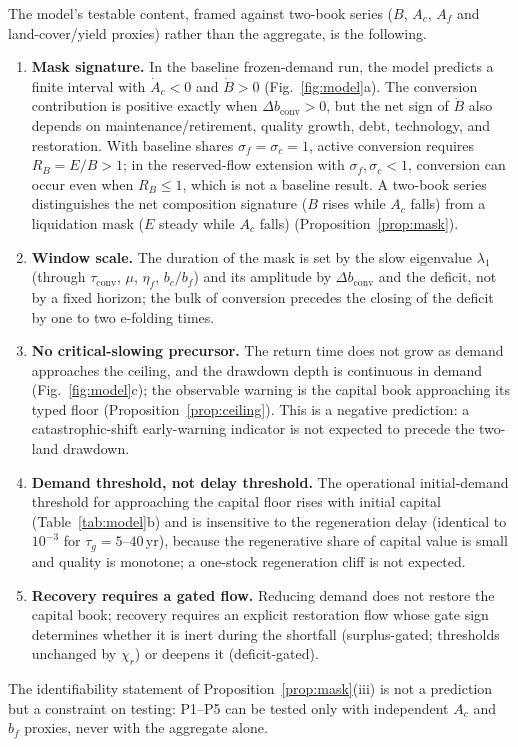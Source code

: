 \documentclass[preprint,12pt,authoryear]{elsarticle}
\newcommand{\dconv}{\Delta b_{\mathrm{conv}}}
\newcommand{\tconv}{\tau_{\mathrm{conv}}}
\begin{document}
The model's testable content, framed against two-book series ($B$, $A_c$, $A_f$ and land-cover/yield proxies) rather than the aggregate, is the following.
\begin{enumerate}[label=P\arabic*.,leftmargin=2.2em]
\item \textbf{Mask signature.} In the baseline frozen-demand run, the model predicts a finite interval with $\dot A_c<0$ and $\dot B>0$ (Fig.~\ref{fig:model}a). The conversion contribution is positive exactly when $\dconv>0$, but the net sign of $\dot B$ also depends on maintenance/retirement, quality growth, debt, technology, and restoration. With baseline shares $\sigma_f=\sigma_c=1$, active conversion requires $R_B=E/B>1$; in the reserved-flow extension with $\sigma_f,\sigma_c<1$, conversion can occur even when $R_B\le1$, which is not a baseline result. A two-book series distinguishes the net composition signature ($B$ rises while $A_c$ falls) from a liquidation mask ($E$ steady while $A_c$ falls) (Proposition~\ref{prop:mask}).
\item \textbf{Window scale.} The duration of the mask is set by the slow eigenvalue $\lambda_1$ (through $\tconv$, $\mu$, $\eta_f$, $b_c/b_f$) and its amplitude by $\dconv$ and the deficit, not by a fixed horizon; the bulk of conversion precedes the closing of the deficit by one to two e-folding times.
\item \textbf{No critical-slowing precursor.} The return time does not grow as demand approaches the ceiling, and the drawdown depth is continuous in demand (Fig.~\ref{fig:model}c); the observable warning is the capital book approaching its typed floor (Proposition~\ref{prop:ceiling}). This is a negative prediction: a catastrophic-shift early-warning indicator is not expected to precede the two-land drawdown.
\item \textbf{Demand threshold, not delay threshold.} The operational initial-demand threshold for approaching the capital floor rises with initial capital (Table~\ref{tab:model}b) and is insensitive to the regeneration delay (identical to $10^{-3}$ for $\tau_g=5$--$40$\,yr), because the regenerative share of capital value is small and quality is monotone; a one-stock regeneration cliff is not expected.
\item \textbf{Recovery requires a gated flow.} Reducing demand does not restore the capital book; recovery requires an explicit restoration flow whose gate sign determines whether it is inert during the shortfall (surplus-gated; thresholds unchanged by $\chi_r$) or deepens it (deficit-gated).
\end{enumerate}
The identifiability statement of Proposition~\ref{prop:mask}(iii) is not a prediction but a constraint on testing: P1--P5 can be tested only with independent $A_c$ and $b_f$ proxies, never with the aggregate alone.
\end{document}
